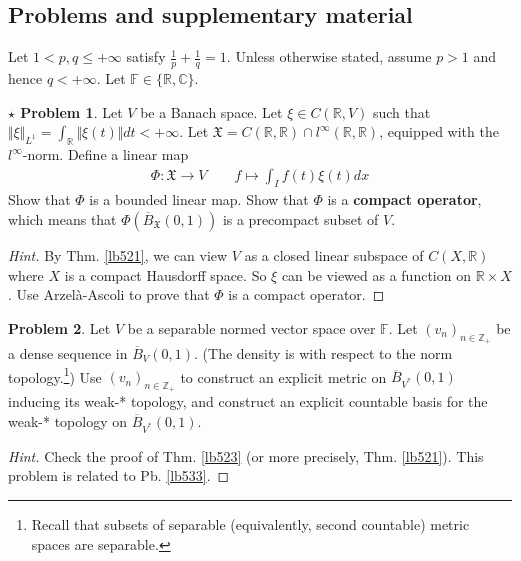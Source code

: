 \documentclass[12pt,b5paper,notitlepage]{article}
\theoremstyle{definition}
\newtheorem{prob}{\color{red}Problem}[section]
\newtheorem{sprob}[prob]{\color{red}$\star$ Problem}
\theoremstyle{plain}
\newcommand{\fk}{\mathfrak}
\newcommand{\ovl}{\overline}
\newcommand{\Cbb}{\mathbb C}
\newcommand{\Zbb}{\mathbb Z}
\newcommand{\Rbb}{\mathbb R}
\newcommand{\Fbb}{\mathbb F}
\numberwithin{equation}{section}
\begin{document}
\subsection{Problems and supplementary material}


Let $1<p,q\leq +\infty$ satisfy $\frac 1p+\frac 1q=1$. Unless otherwise stated, assume $p>1$ and hence $q<+\infty$. Let $\Fbb\in\{\Rbb,\Cbb\}$. 


\begin{sprob}
Let $V$ be a Banach space. Let $\xi\in C(\Rbb,V)$ such that $\Vert \xi\Vert_{L^1}=\int_\Rbb \Vert \xi(t)\Vert dt<+\infty$. Let $\fk X=C(\Rbb,\Rbb)\cap l^\infty(\Rbb,\Rbb)$, equipped with the $l^\infty$-norm. Define a linear map
\begin{align*}
\Phi:\fk X\rightarrow V\qquad f\mapsto \int_I f(t)\xi(t)dx
\end{align*}
Show that $\Phi$ is a bounded linear map. Show that $\Phi$ is a \textbf{compact operator}, which means that $\Phi(\ovl B_{\fk X}(0,1))$ is a precompact subset of $V$.
\end{sprob}

\begin{proof}[Hint]
By Thm. \ref{lb521}, we can view $V$ as a closed linear subspace of $C(X,\Rbb)$ where $X$ is a compact Hausdorff space. So $\xi$ can be viewed as a function on $\Rbb\times X$. Use Arzel\`a-Ascoli to prove that $\Phi$ is a compact operator.
\end{proof}



\begin{prob}\label{lb535}
Let $V$ be a separable normed vector space over $\Fbb$. Let $(v_n)_{n\in\Zbb_+}$ be a dense sequence in $\ovl B_V(0,1)$. (The density is with respect to the norm topology.\footnote{Recall that subsets of separable (equivalently, second countable) metric spaces are separable.}) Use $(v_n)_{n\in\Zbb_+}$ to construct an explicit metric on $\ovl B_{V^*}(0,1)$ inducing its weak-* topology, and construct an explicit countable basis for the weak-* topology on $\ovl B_{V^*}(0,1)$.
\end{prob}

\begin{proof}[Hint]
Check the proof of Thm. \ref{lb523} (or more precisely, Thm. \ref{lb521}). This problem is related to Pb. \ref{lb533}.
\end{proof}
\end{document}

